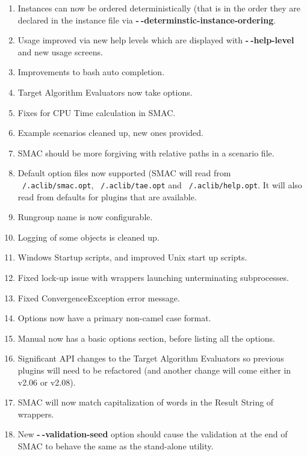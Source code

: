 \documentclass[11pt,letterpaper,oneside]{article}
\begin{document}
\begin{description}
\begin{enumerate}
					 \item Instances can now be ordered deterministically (that is in the order they are declared in the instance file via \textbf{-$~\!$-determinstic-instance-ordering}.
					 \item Usage improved via new help levels which are displayed with \textbf{-$~\!$-help-level} and new usage screens.
					 \item Improvements to bash auto completion.
					 \item Target Algorithm Evaluators now take options.
					 \item Fixes for CPU Time calculation in SMAC.
					 \item Example scenarios cleaned up, new ones provided.
					 \item SMAC should be more forgiving with relative paths in a scenario file.
					 \item Default option files now supported (SMAC will read from \texttt{~/.aclib/smac.opt}, \texttt{~/.aclib/tae.opt} and \texttt{~/.aclib/help.opt}. It will also read from defaults for plugins that are available.
					 \item Rungroup name is now configurable.
					 \item Logging of some objects is cleaned up.
					 \item Windows Startup scripts, and improved Unix start up scripts.
					 \item Fixed lock-up issue with wrappers launching unterminating subprocesses.
					 \item Fixed ConvergenceException error message.
					 \item Options now have a primary non-camel case format.
					 \item Manual now has a basic options section, before listing all the options.
					 \item Significant API changes to the Target Algorithm Evaluators so previous plugins will need to be refactored (and another change will come either in v2.06 or v2.08).
					 \item SMAC will now match capitalization of words in the Result String of wrappers.
					 \item New \textbf{-$~\!$-validation-seed} option should cause the validation at the end of SMAC to behave the same as the stand-alone utility.
                  \end{enumerate}


\end{description}
\end{document}
